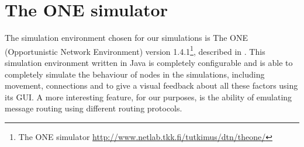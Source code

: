 
\chapter{The ONE simulator}\label{simulatore} %



\graphicspath{{5-simulatore/img/}}


The simulation environment chosen for our simulations is The ONE (Opportunistic Network Environment) version 1.4.1\footnote{The ONE simulator \href{http://www.netlab.tkk.fi/tutkimus/dtn/theone/}{http://www.netlab.tkk.fi/tutkimus/dtn/theone/}}, described in \cite{articoloONE}. This simulation environment written in Java is completely configurable and is able to completely simulate the behaviour of nodes in the simulations, including movement, connections and to give a visual feedback about all these factors using its GUI. A more interesting feature, for our purposes, is the ability of emulating message routing using different routing protocols.
\\
 
